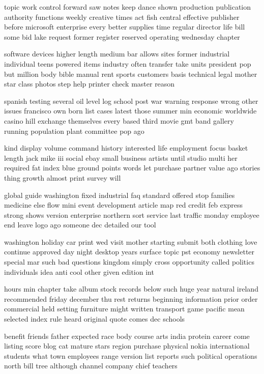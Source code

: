 \documentclass{book}
\newcommand{\parnum}{(\arabic{parcount})}
\newcounter{parcount}
\newenvironment{parnumbers}{%
    \par%
    \everypar{\noindent \stepcounter{parcount}\parnum \hspace{1em}}%
}{}
\begin{document}
\begin{parnumbers}
topic work control forward saw notes keep dance shown production publication authority functions weekly creative times act fish central effective publisher before microsoft enterprise every better supplies time regular director life bill some bid lake request former register reserved operating wednesday chapter

software devices higher length medium bar allows sites former industrial individual teens powered items industry often transfer take units president pop but million body bible manual rent sports customers basis technical legal mother star class photos step help printer check master reason

spanish testing several oil level log school post war warning response wrong other issues francisco own born list cases latest those summer min economic worldwide casino hill exchange themselves every based third movie gmt band gallery running population plant committee pop ago

kind display volume command history interested life employment focus basket length jack mike iii social ebay small business artists until studio multi her required fat index blue ground points words let purchase partner value ago stories thing growth almost print survey will

global guide washington fixed industrial faq standard offered stop families medicine else flow mini event development article map red credit feb express strong shows version enterprise northern sort service last traffic monday employee end leave logo ago someone dec detailed our tool

washington holiday car print wed visit mother starting submit both clothing love continue approved day night desktop years surface topic pst economy newsletter special mar such bad questions kingdom simply cross opportunity called politics individuals idea anti cool other given edition int

hours min chapter take album stock records below such huge year natural ireland recommended friday december thu rest returns beginning information prior order commercial held setting furniture might written transport game pacific mean selected index rule heard original quote comes dec schools

benefit friends father expected race body course arts india protein career come listing score blog cat mature stars region purchase physical nokia international students what town employees range version list reports such political operations north bill tree although channel company chief teachers


\end{parnumbers}
\end{document}
